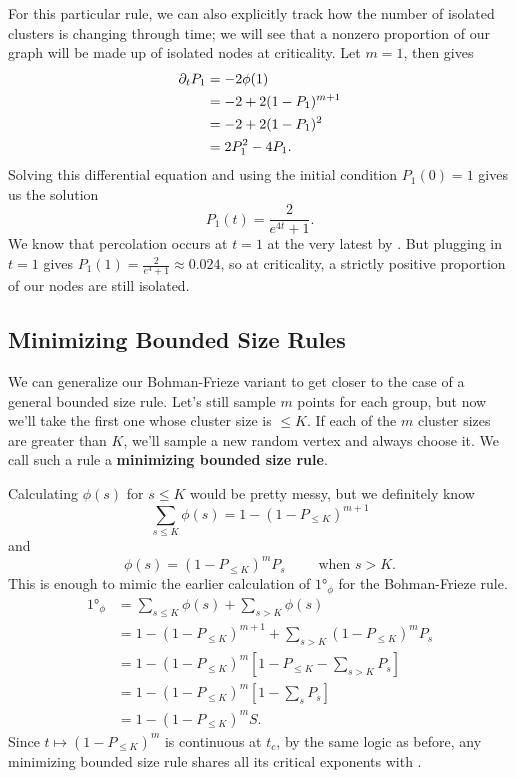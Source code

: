 \documentclass[twoside,10pt]{article}
\newcommand{\BF}{Bohman-Frieze\xspace}
\begin{document}
\begin{ex}[]
	\label{nonzero-at-criticality}
For this particular rule, we can also explicitly track how the number of isolated clusters is changing through time; we will see that a nonzero proportion of our graph will be made up of isolated nodes at criticality. Let $m=1$, then  gives
\begin{align*}
        \partial_{t}{P_1} &= -2 \phi(1) \\
                    &= -2 + 2(1-P_1)^{m+1} \\
                    &= -2 + 2(1-P_1)^{2} \\
                    &= 2P_1^{2} - 4P_1.
\end{align*}
Solving this differential equation and using the initial condition $P_1(0)=1$ gives us the solution
\[
        P_1(t) = \frac{2}{e^{4t}+1} .
\]
We know that percolation occurs at $t=1$ at the very latest by \cite{RW-cont}. But plugging in $t=1$ gives $P_1(1) = \frac{2}{e^{4}+1} \approx 0.024$, so at criticality, a strictly positive proportion of our nodes are still isolated.
\end{ex}

\subsection{Minimizing Bounded Size Rules}
\label{minimizing-bounded-size-rules}


We can generalize our \BF variant to get closer to the case of a general bounded size rule. Let's still sample $m$ points for each group, but now we'll take the first one whose cluster size is $\leq K$. If each of the $m$ cluster sizes are greater than $K$, we'll sample a new random vertex and always choose it. We call such a rule a \textbf{minimizing bounded size rule}.

Calculating $\phi(s)$ for $s \leq K$ would be pretty messy, but we definitely know
\[
        \sum_{s \leq K} \phi(s) = 1 - (1-P_{\leq K})^{m+1}
\] and
\[
        \phi(s) = (1-P_{\leq K})^{m}P_{s} \qquad \text{ when } s>K.
\] This is enough to mimic the earlier calculation of $\ang{1}_{\phi}$ for the \BF rule.
\begin{align*}
        \ang{1}_{\phi} &= \sum_{s \leq K}\phi(s) + \sum_{s > K}\phi(s) \\
                       &= 1 - (1-P_{\leq K})^{m+1} + \sum_{s>K}(1-P_{\leq K})^{m}P_s \\
                       &= 1 - (1-P_{\leq K})^{m} \left[ 1 - P_{\leq K}-\sum_{s>K}P_s \right] \\
                       &= 1 - (1-P_{\leq K})^{m} \left[ 1 - \sum_s P_s \right] \\
                       &= 1 - (1-P_{\leq K})^{m} S.
\end{align*}
Since $t \mapsto (1-P_{\leq K})^{m}$ is continuous at $t_c$, by the same logic as before, any minimizing bounded size rule shares all its critical exponents with \ER.
\end{document}
